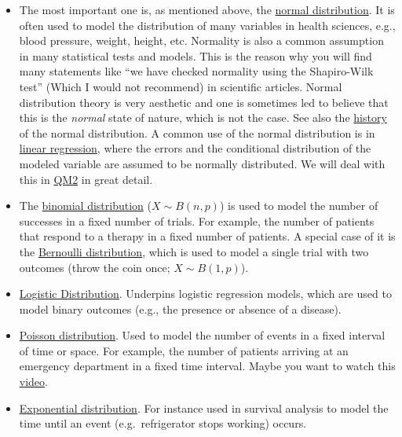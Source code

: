 \documentclass[
]{book}
\begin{document}
\begin{itemize}
\item
  The most important one is, as mentioned above, the \href{https://en.wikipedia.org/wiki/Normal_distribution}{normal distribution}.
  It is often used to model the distribution of many variables in health sciences, e.g., blood pressure, weight, height, etc.
  Normality is also a common assumption in many statistical tests and models. This is the reason why you will find many statements like
  ``we have checked normality using the Shapiro-Wilk test'' (Which I would not recommend) in scientific articles.
  Normal distribution theory is very aesthetic and one is sometimes led to believe that this is the \emph{normal} state of nature, which is
  not the case. See also the \href{https://en.wikipedia.org/wiki/Normal_distribution\#History}{history} of the normal distribution.
  A common use of the normal distribution is in \href{https://en.wikipedia.org/wiki/Linear_regression}{linear regression},
  where the errors and the conditional distribution of the modeled variable are assumed to be normally distributed.
  We will deal with this in \href{https://jdegenfellner.github.io/Script_QM2_ZHAW/}{QM2} in great detail.
\item
  The \href{https://en.wikipedia.org/wiki/Binomial_distribution}{binomial distribution} (\(X \sim B(n, p)\)) is used to model the number of successes in a fixed number of trials.
  For example, the number of patients that respond to a therapy in a fixed number of patients.
  A special case of it is the \href{https://en.wikipedia.org/wiki/Bernoulli_distribution}{Bernoulli distribution},
  which is used to model a single trial with two outcomes (throw the coin once; \(X \sim B(1,p)\)).
\item
  \href{https://en.wikipedia.org/wiki/Logistic_distribution}{Logistic Distribution}. Underpins logistic regression models,
  which are used to model binary outcomes (e.g., the presence or absence of a disease).
\item
  \href{https://en.wikipedia.org/wiki/Poisson_distribution}{Poisson distribution}. Used to model the number of events in a fixed interval of time or space.
  For example, the number of patients arriving at an emergency department in a fixed time interval.
  Maybe you want to watch this \href{https://www.youtube.com/watch?v=jmqZG6roVqU&ab_channel=jbstatistics}{video}.
\item
  \href{https://en.wikipedia.org/wiki/Exponential_distribution}{Exponential distribution}.
  For instance used in survival analysis to model the time until an event (e.g.~refrigerator stops working) occurs.

\end{itemize}
\end{document}
